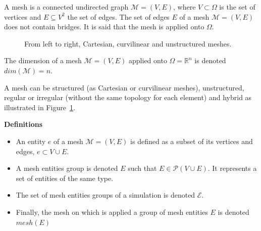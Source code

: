 \begin{mydef}
A mesh is a connected undirected graph $\mathcal{M}=(V,E)$, where $V\subset \Omega$ is the set of vertices and $E\subseteq V^2$ the set of edges. The set of edges $E$ of a mesh $\mathcal{M}=(V,E)$ does not contain bridges. It is said that the mesh is applied onto $\Omega$.
\end{mydef}
\begin{figure}[!h]\begin{center}
  \caption{From left to right, Cartesian, curvilinear and unstructured meshes.}
  \label{fig:mesh}
\end{center}\end{figure}
\begin{mydef}
The dimension of a mesh $\mathcal{M}=(V,E)$ applied onto $\Omega=\mathbb{R}^n$ is denoted $dim(\mathcal{M})=n$.
\end{mydef}
A mesh can be structured (as Cartesian or curvilinear meshes), unstructured, regular or irregular (without the same topology for each element) and hybrid as illustrated in Figure~\ref{fig:mesh}.

\medskip
\noindent \textbf{Definitions}
\begin{itemize}
\item An entity $e$ of a mesh $\mathcal{M}=(V,E)$ is defined as a subset of its vertices and edges, $e\subset V\cup E$.
\item A mesh entities group is denoted $E$ such that $E \in \mathcal{P}(V\cup E)$. It represents a set of entities of the same type.
\item The set of mesh entities groups of a simulation is denoted $\mathcal{E}$.
\item Finally, the mesh on which is applied a group of mesh entities $E$ is denoted $mesh(E)$
\end{itemize}

